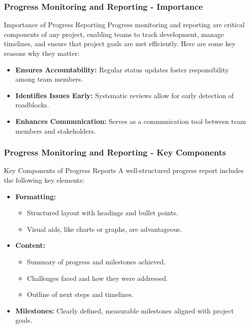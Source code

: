 \documentclass[aspectratio=169]{beamer}
\begin{document}
\begin{frame}[fragile]
    \frametitle{Progress Monitoring and Reporting - Importance}
    \begin{block}{Importance of Progress Reporting}
        Progress monitoring and reporting are critical components of any project, enabling teams to track development, manage timelines, and ensure that project goals are met efficiently. Here are some key reasons why they matter:
    \end{block}
    \begin{itemize}
        \item \textbf{Ensures Accountability:} Regular status updates foster responsibility among team members.
        \item \textbf{Identifies Issues Early:} Systematic reviews allow for early detection of roadblocks.
        \item \textbf{Enhances Communication:} Serves as a communication tool between team members and stakeholders.
    \end{itemize}
\end{frame}

\begin{frame}[fragile]
    \frametitle{Progress Monitoring and Reporting - Key Components}
    \begin{block}{Key Components of Progress Reports}
        A well-structured progress report includes the following key elements:
    \end{block}
    \begin{itemize}
        \item \textbf{Formatting:}
            \begin{itemize}
                \item Structured layout with headings and bullet points.
                \item Visual aids, like charts or graphs, are advantageous.
            \end{itemize}
        \item \textbf{Content:}
            \begin{itemize}
                \item Summary of progress and milestones achieved.
                \item Challenges faced and how they were addressed.
                \item Outline of next steps and timelines.
            \end{itemize}
        \item \textbf{Milestones:} Clearly defined, measurable milestones aligned with project goals.
    \end{itemize}
\end{frame}
\end{document}
